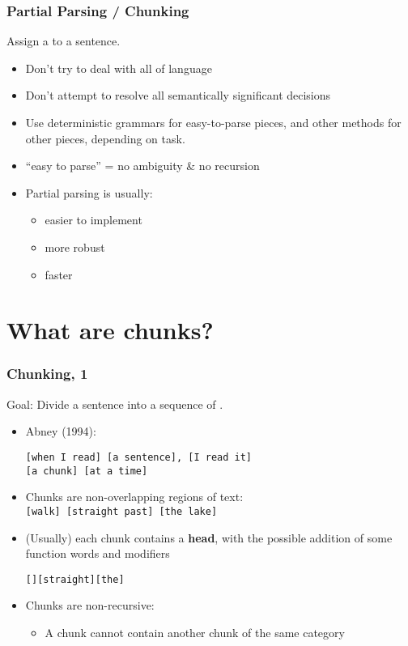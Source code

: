 \begin{frame}[fragile]
  \frametitle{Partial Parsing / Chunking}

Assign a  to a sentence.
\begin{itemize}
  \item Don't try to deal with all of language
  \item Don't attempt to resolve all semantically significant decisions
  \item Use deterministic grammars for easy-to-parse
    pieces, and other methods for other pieces, depending on task.
  \item ``easy to parse'' = no ambiguity \& no recursion

    
\item Partial parsing is usually:
  \begin{itemize}
  \item easier to implement
  \item more robust
  \item faster
  \end{itemize}
\end{itemize}

 

\end{frame}


\section{What are chunks?}

\begin{frame}[fragile]
  \frametitle{Chunking, 1}

Goal: Divide a sentence into a sequence of .

  \begin{itemize}
  \item   Abney (1994):
\begin{verbatim}
[when I read] [a sentence], [I read it] 
[a chunk] [at a time]
\end{verbatim}
     \item Chunks are non-overlapping regions of text:\\
         \verb![walk] [straight past] [the lake]!
        \item (Usually) each chunk contains a \textbf{head}, with the possible
          addition of some  function words and modifiers\\
\begin{alltt}
[] [straight ] [the ]
\end{alltt}
 
        \item Chunks are non-recursive:
          \begin{itemize}
            \item A chunk cannot contain another chunk of the same category
          \end{itemize}

  \end{itemize}

\end{frame}

